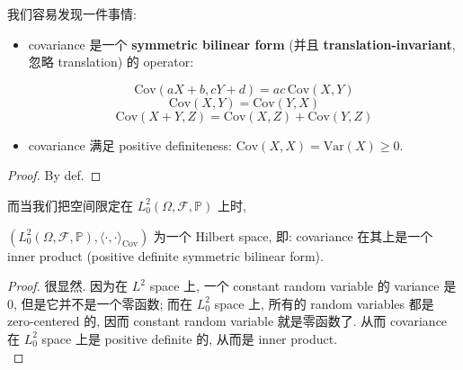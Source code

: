 我们容易发现一件事情:

\begin{theorem}{}

\begin{itemize}
\item
  covariance 是一个 \textbf{symmetric bilinear form} (并且 \textbf{translation-invariant}, 忽略 translation) 的 operator:

  \[\text{Cov}(\mathit{a}\mathit{X} + \mathit{b},\mathit{c}\mathit{Y} + \mathit{d}) = \mathit{a}\mathit{c}\,\text{Cov}(\mathit{X},\mathit{Y})\]\[\text{Cov}(\mathit{X},\mathit{Y}) = \text{Cov}(\mathit{Y},\mathit{X})\]\[\text{Cov}(\mathit{X} + \mathit{Y},\mathit{Z}) = \text{Cov}(\mathit{X},\mathit{Z}) + \text{Cov}(\mathit{Y},\mathit{Z})\]
\item
  covariance 满足 positive definiteness: \(\text{Cov}(\mathit{X},\mathit{X}) = \text{Var}(\mathit{X}) \geq 0\).
\end{itemize}

\end{theorem}

\begin{proof}

By def.

\end{proof}

而当我们把空间限定在 \(\mathit{L}_{0}^{2}(\Omega,\mathcal{F},\mathbb{P})\) 上时,

\begin{theorem}{}

\((\mathit{L}_{0}^{2}(\Omega,\mathcal{F},\mathbb{P}),\langle \cdot , \cdot \rangle_{\text{Cov}})\) 为一个 Hilbert space, 即: covariance 在其上是一个 inner product (positive definite symmetric bilinear form).

\end{theorem}

\begin{proof}

很显然. 因为在 \(\mathit{L}^{2}\) space 上, 一个 constant random variable 的 variance 是 0, 但是它并不是一个零函数; 而在 \(\mathit{L}_{0}^{2}\) space 上, 所有的 random variables 都是 zero-centered 的, 因而 constant random variable 就是零函数了. 从而 covariance 在 \(\mathit{L}_{0}^{2}\) space 上是 positive definite 的, 从而是 inner product.\\

\end{proof}

